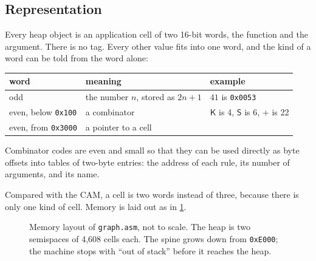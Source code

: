 \documentclass[11pt,a4paper]{article}
\newcommand{\cmb}[1]{\textsf{#1}}
\newcommand{\K}{\cmb{K}}
\newcommand{\Sc}{\cmb{S}}
\theoremstyle{definition}
\theoremstyle{plain}
\begin{document}
\subsection{Representation}

Every heap object is an application cell of two 16-bit words, the function
and the argument. There is no tag. Every other value fits into one word, and
the kind of a word can be told from the word alone:

\begin{center}
\small
\begin{tabular}{@{}l l l@{}}
\toprule
word & meaning & example\\
\midrule
odd & the number $n$, stored as $2n+1$ & $41$ is \texttt{0x0053}\\
even, below \texttt{0x100} & a combinator & $\K$ is 4, $\Sc$ is 6, ${+}$ is 22\\
even, from \texttt{0x3000} & a pointer to a cell & \\
\bottomrule
\end{tabular}
\end{center}

\noindent
Combinator codes are even and small so that they can be used directly as
byte offsets into tables of two-byte entries: the address of each rule, its
number of arguments, and its name.

Compared with the CAM, a cell is two words instead of three, because there is
only one kind of cell. Memory is laid out as in \cref{fig:memory}.

\begin{figure}[t]
\centering
{}
\caption{Memory layout of \texttt{graph.asm}, not to scale. The heap is two
semispaces of 4,608 cells each. The spine grows down from \texttt{0xE000};
the machine stops with ``out of stack'' before it reaches the heap.}
\label{fig:memory}
\end{figure}
\end{document}
